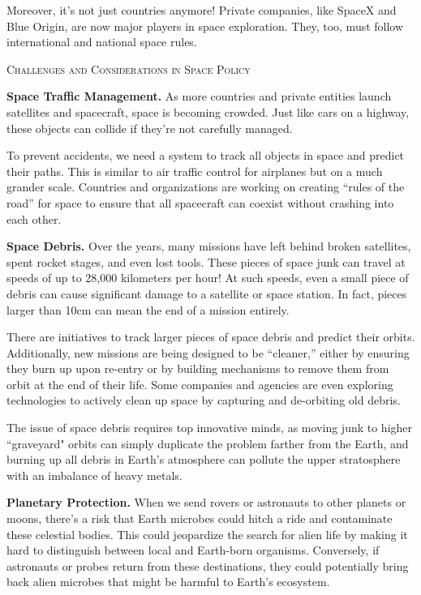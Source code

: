 Moreover, it's not just countries anymore! Private companies, like SpaceX and Blue Origin, are now major players in space exploration. They, too, must follow international and national space rules.


\vspace{15pt}

\textsc{Challenges and Considerations in Space Policy}\\

\vspace{-1cm}

\strut\hrulefill

\vspace{5pt}

\textbf{Space Traffic Management.} As more countries and private entities launch satellites and spacecraft, space is becoming crowded. Just like cars on a highway, these objects can collide if they're not carefully managed. 

To prevent accidents, we need a system to track all objects in space and predict their paths. This is similar to air traffic control for airplanes but on a much grander scale. Countries and organizations are working on creating ``rules of the road'' for space to ensure that all spacecraft can coexist without crashing into each other.

\textbf{Space Debris.} Over the years, many missions have left behind broken satellites, spent rocket stages, and even lost tools. These pieces of space junk can travel at speeds of up to 28,000 kilometers per hour! At such speeds, even a small piece of debris can cause significant damage to a satellite or space station. In fact, pieces larger than 10cm can mean the end of a mission entirely.

There are initiatives to track larger pieces of space debris and predict their orbits. Additionally, new missions are being designed to be ``cleaner,'' either by ensuring they burn up upon re-entry or by building mechanisms to remove them from orbit at the end of their life. Some companies and agencies are even exploring technologies to actively clean up space by capturing and de-orbiting old debris.

The issue of space debris requires top innovative minds, as moving junk to higher ``graveyard" orbits can simply duplicate the problem farther from the Earth, and burning up all debris in Earth's atmosphere can pollute the upper stratosphere with an imbalance of heavy metals. 

\textbf{Planetary Protection.} When we send rovers or astronauts to other planets or moons, there's a risk that Earth microbes could hitch a ride and contaminate these celestial bodies. This could jeopardize the search for alien life by making it hard to distinguish between local and Earth-born organisms. Conversely, if astronauts or probes return from these destinations, they could potentially bring back alien microbes that might be harmful to Earth's ecosystem.

